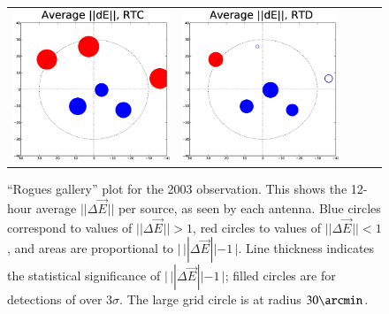 \documentclass[]{aa}
\newcommand{\jones}[2]{\vec {#1}_{#2}}
\begin{document}
\begin{figure}
\begin{tabular}{@{}c@{}c@{}c@{}c@{}c@{}}
\includegraphics[width=\roguewidth]{o2003_dE_antC} &
\includegraphics[width=\roguewidth]{o2003_dE_antD} 
\end{tabular}
\caption{\label{fig:rogues-2003}``Rogues gallery'' plot for the 2003 observation. This shows the 12-hour average $||\Delta\jones{E}{}||$ per source, as seen by each antenna. Blue circles correspond to values of $||\Delta\jones{E}{}||>1$, red circles to values of $||\Delta\jones{E}{}||<1$, and areas are proportional to $|\,||\Delta\jones{E}{}||-1\,|$. Line thickness indicates the statistical significance of $|\,||\Delta\jones{E}{}||-1\,|$; filled circles are for detections of over $3\sigma$. The large grid circle is at radius $30\arcmin$.}
\end{figure}
\end{document}
